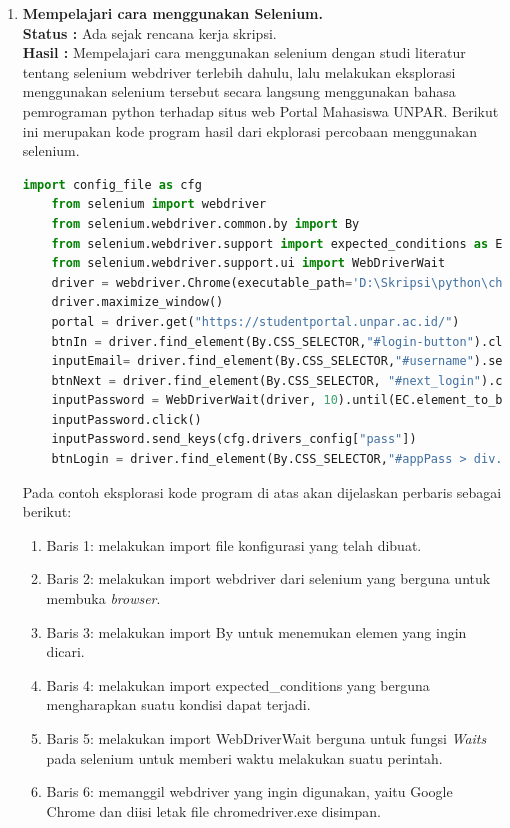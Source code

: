\documentclass[a4paper,twoside]{article}
\begin{document}
\begin{enumerate}
		\item \textbf{Mempelajari cara menggunakan Selenium.}\\
		{\bf Status :} Ada sejak rencana kerja skripsi.\\
		{\bf Hasil :} Mempelajari cara menggunakan selenium dengan studi literatur tentang selenium webdriver terlebih dahulu, lalu melakukan eksplorasi menggunakan selenium tersebut secara langsung menggunakan bahasa pemrograman python terhadap situs web Portal Mahasiswa UNPAR. Berikut ini merupakan kode program hasil dari ekplorasi percobaan menggunakan selenium.
		\begin{lstlisting}[language=python, caption=Eksplorasi kode Program menggunakan Selenium]
	import config_file as cfg
	from selenium import webdriver
	from selenium.webdriver.common.by import By
	from selenium.webdriver.support import expected_conditions as EC
	from selenium.webdriver.support.ui import WebDriverWait
	driver = webdriver.Chrome(executable_path='D:\Skripsi\python\chromedriver.exe')
	driver.maximize_window()
	portal = driver.get("https://studentportal.unpar.ac.id/")
	btnIn = driver.find_element(By.CSS_SELECTOR,"#login-button").click()
	inputEmail= driver.find_element(By.CSS_SELECTOR,"#username").send_keys(cfg.drivers_config["email"])
	btnNext = driver.find_element(By.CSS_SELECTOR, "#next_login").click()
	inputPassword = WebDriverWait(driver, 10).until(EC.element_to_be_clickable((By.CSS_SELECTOR,"#password")))
	inputPassword.click()
	inputPassword.send_keys(cfg.drivers_config["pass"])
	btnLogin = driver.find_element(By.CSS_SELECTOR,"#appPass > div.login__form > button").click()\end{lstlisting}
	Pada contoh eksplorasi kode program di atas akan dijelaskan perbaris sebagai berikut:
	\begin{enumerate}
		\item Baris 1: melakukan import file konfigurasi yang telah dibuat.
		\item Baris 2: melakukan import webdriver dari selenium yang berguna untuk membuka \textit{browser}.
		\item Baris 3: melakukan import By untuk menemukan elemen yang ingin dicari.
		\item Baris 4: melakukan import expected\_conditions yang berguna mengharapkan suatu kondisi dapat terjadi.
		\item Baris 5: melakukan import WebDriverWait berguna untuk fungsi \textit{Waits} pada selenium untuk memberi waktu melakukan suatu perintah.
		\item Baris 6: memanggil webdriver yang ingin digunakan, yaitu Google Chrome dan diisi letak file chromedriver.exe disimpan.

\end{enumerate}
\end{enumerate}
\end{document}

